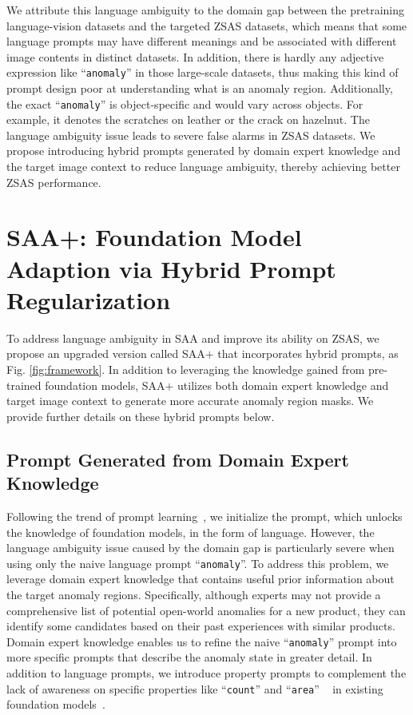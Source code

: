 We attribute this language ambiguity to the domain gap between the pretraining language-vision datasets and the targeted ZSAS datasets, which means that some language prompts may have different meanings and be associated with different image contents in distinct datasets. In addition, there is hardly any adjective expression like ``\verb|anomaly|'' in those large-scale datasets, thus making this kind of prompt design poor at understanding what is an anomaly region. Additionally, the exact ``\verb|anomaly|'' is object-specific and would vary across objects. For example, it denotes the scratches on leather or the crack on hazelnut. The language ambiguity issue leads to severe false alarms in ZSAS datasets. We propose introducing hybrid prompts generated by domain expert knowledge and the target image context to reduce language ambiguity, thereby achieving better ZSAS performance. 

\section{SAA+: Foundation Model Adaption via Hybrid Prompt Regularization}
\label{sec:method}  

To address language ambiguity in SAA and improve its ability on ZSAS, we propose an upgraded version called SAA$+$ that incorporates hybrid prompts, as Fig. \ref{fig:framework}. In addition to leveraging the knowledge gained from pre-trained foundation models, SAA$+$ utilizes both domain expert knowledge and target image context to generate more accurate anomaly region masks. We provide further details on these hybrid prompts below.

\subsection{Prompt Generated from Domain Expert Knowledge}

Following the trend of prompt learning~\cite{zhou_conditional,zhou_learning_2022}, we initialize the prompt, which unlocks the knowledge of foundation models, in the form of language. However, the language ambiguity issue caused by the domain gap is particularly severe when using only the naive language prompt ``\verb|anomaly|''. To address this problem, we leverage domain expert knowledge that contains useful prior information about the target anomaly regions. Specifically, although experts may not provide a comprehensive list of potential open-world anomalies for a new product, they can identify some candidates based on their past experiences with similar products. Domain expert knowledge enables us to refine the naive ``\verb|anomaly|'' prompt into more specific prompts that describe the anomaly state in greater detail. In addition to language prompts, we introduce property prompts to complement the lack of awareness on specific properties like ``\verb|count|'' and ``\verb|area|'' ~\cite{paiss_count_2023} in existing foundation models~\cite{paiss_count_2023}.

